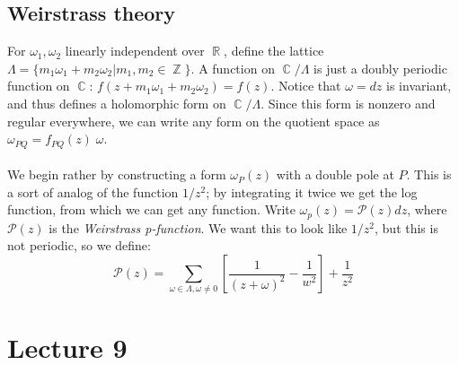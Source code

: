 \documentclass[12 pt]{article}
\DeclareMathOperator {\R} {\mathbb{R}}
\DeclareMathOperator {\C} {\mathbb{C}}
\DeclareMathOperator {\Z} {\mathbb{Z}}
\theoremstyle{plain}
\theoremstyle{definition}
\theoremstyle{remark}
\begin{document}
\subsection*{Weirstrass theory}
For $\omega_1, \omega_2$ linearly independent over $\R$, define the lattice $\Lambda = \{ m_1 \omega_1 + m_2 \omega_2 | m_1, m_2 \in \Z  \}$. A function on $\C/\Lambda$ is just a doubly periodic function on $\C$: $f(z + m_1 \omega_1 + m_2 \omega_2) = f(z)$. Notice that $\omega = dz$ is invariant, and thus defines a holomorphic form on $\C/\Lambda$. Since this form is nonzero and regular everywhere, we can write any form on the quotient space as $\omega_{PQ} = f_{PQ}(z)\; \omega$.
\\
\\
We begin rather by constructing a form $\omega_P (z)$ with a double pole at $P$. This is a sort of analog of the function $1/z^2$; by integrating it twice we get the log function, from which we can get any function. Write $\omega_p(z) = \mathcal{P}(z) dz$, where $\mathcal{P}(z)$ is the \emph{Weirstrass p-function}. We want this to look like $1/z^2$, but this is not periodic, so we define:
\[     \mathcal{P}(z) = \sum_{\omega \in \Lambda, \omega\neq 0} \left[ \frac{1}{(z+\omega)^2} - \frac{1}{w^2}  \right]   + \frac{1}{z^2}   \]



\section*{Lecture 9}
\end{document}

